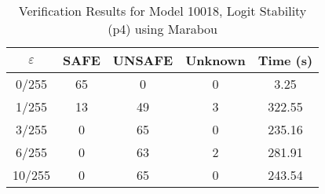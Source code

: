 \begin{table}[htbp]
\centering
\caption{Verification Results for Model 10018, Logit Stability (p4) using Marabou}
\label{tab:model10018_p4_marabou}
\begin{tabular}{|c|c|c|c|c|}
\hline
$\varepsilon$ & SAFE & UNSAFE & Unknown & Time (s) \\ \hline
0/255 & 65 & 0 & 0 & 3.25 \\ \hline
1/255 & 13 & 49 & 3 & 322.55 \\ \hline
3/255 & 0 & 65 & 0 & 235.16 \\ \hline
6/255 & 0 & 63 & 2 & 281.91 \\ \hline
10/255 & 0 & 65 & 0 & 243.54 \\ \hline
\end{tabular}
\end{table}
